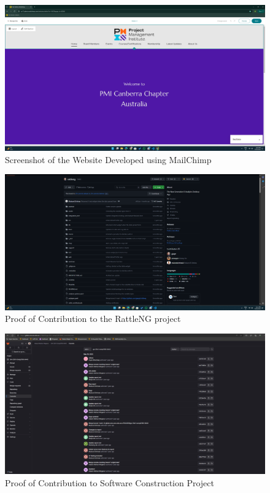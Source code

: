 \documentclass{article}
\begin{document}
\vspace{1cm}

\begin{figure}[ht!]
    \centering
    \includegraphics[width=\textwidth, height=0.4\textheight, keepaspectratio]{../PMICanberra_Work.png}
    \caption{Screenshot of the Website Developed using MailChimp}
    \label{fig:PMI Canberra}
\end{figure}

\begin{figure}[ht!]
    \centering
    \includegraphics[width=\textwidth, height=0.4\textheight, keepaspectratio]{../rattleng_Experience.png}
    \caption{Proof of Contribution to the RattleNG project}
    \label{fig:RattleNG}
\end{figure}

\begin{figure}[ht!]
    \centering
    \includegraphics[width=\textwidth, height=0.4\textheight, keepaspectratio]{../Software_Construction_Proof.png}
    \caption{Proof of Contribution to Software Construction Project}
    \label{fig:Software Construction}
\end{figure}
\end{document}
